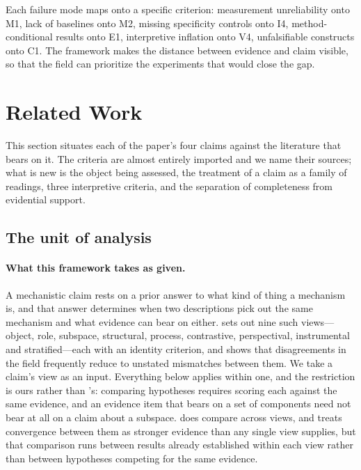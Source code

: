 \documentclass{article}
\begin{document}
Each failure mode maps onto a specific criterion: measurement unreliability onto M1, lack of baselines onto M2, missing specificity controls onto I4, method-conditional results onto E1, interpretive inflation onto V4, unfalsifiable constructs onto C1. The framework makes the distance between evidence and claim visible, so that the field can prioritize the experiments that would close the gap.


\section{Related Work}
\label{sec:related}

This section situates each of the paper's four claims against the literature that bears on it. The criteria are almost entirely imported and we name their sources; what is new is the object being assessed, the treatment of a claim as a family of readings, three interpretive criteria, and the separation of completeness from evidential support.

\subsection{The unit of analysis}
\label{sec:related-unit}

\paragraph{What this framework takes as given.} A mechanistic claim rests on a prior answer to what kind of thing a mechanism is, and that answer determines when two descriptions pick out the same mechanism and what evidence can bear on either. \citet{tower2026mechviews} sets out nine such views---object, role, subspace, structural, process, contrastive, perspectival, instrumental and stratified---each with an identity criterion, and shows that disagreements in the field frequently reduce to unstated mismatches between them. We take a claim's view as an input. Everything below applies within one, and the restriction is ours rather than \citeauthor{tower2026mechviews}'s: comparing hypotheses requires scoring each against the same evidence, and an evidence item that bears on a set of components need not bear at all on a claim about a subspace. \citeauthor{tower2026mechviews} does compare across views, and treats convergence between them as stronger evidence than any single view supplies, but that comparison runs between results already established within each view rather than between hypotheses competing for the same evidence.
\end{document}

